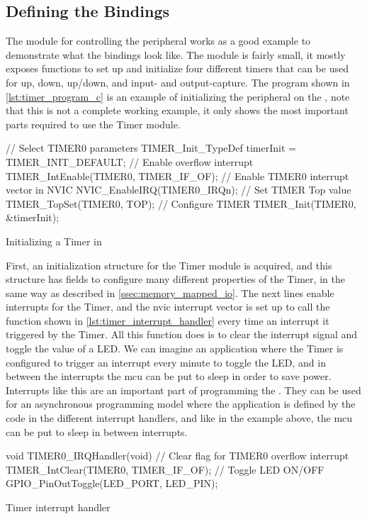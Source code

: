 \subsection{Defining the Bindings}

The {\emlib} module for controlling the  peripheral \cite{an0014_timer} works as a good example to demonstrate what the {\rust} bindings look like.
The module is fairly small, it mostly exposes functions to set up and initialize four different timers that can be used for up, down, up/down, and input- and output-capture.
The program shown in \autoref{lst:timer_program_c} is an example of initializing the  peripheral on the {\gecko}, note that this is not a complete working example, it only shows the most important parts required to use the Timer module.

\begin{listing}[h]
\begin{ccode}
// Select TIMER0 parameters
TIMER_Init_TypeDef timerInit = TIMER_INIT_DEFAULT;
// Enable overflow interrupt
TIMER_IntEnable(TIMER0, TIMER_IF_OF);
// Enable TIMER0 interrupt vector in NVIC
NVIC_EnableIRQ(TIMER0_IRQn);
// Set TIMER Top value
TIMER_TopSet(TIMER0, TOP);
// Configure TIMER
TIMER_Init(TIMER0, &timerInit);
\end{ccode}
\caption{Initializing a Timer in {\C}}
\label{lst:timer_program_c}
\end{listing}

First, an initialization structure for the Timer module is acquired, and this structure has fields to configure many different properties of the Timer, in the same way as described in \autoref{ssec:memory_mapped_io}.
The next lines enable interrupts for the Timer, and the \gls{nvic} interrupt vector is set up to call the function shown in \autoref{lst:timer_interrupt_handler} every time an interrupt it triggered by the Timer.
All this function does is to clear the interrupt signal and toggle the value of a LED.
We can imagine an application where the Timer is configured to trigger an interrupt every minute to toggle the LED, and in between the interrupts the \gls{mcu} can be put to sleep in order to save power.
Interrupts like this are an important part of programming the {\gecko}.
They can be used for an asynchronous programming model where the application is defined by the code in the different interrupt handlers, and like in the example above, the \gls{mcu} can be put to sleep in between interrupts.

\begin{listing}[h]
\begin{ccode}
void TIMER0_IRQHandler(void) {
  // Clear flag for TIMER0 overflow interrupt
  TIMER_IntClear(TIMER0, TIMER_IF_OF);
  // Toggle LED ON/OFF
  GPIO_PinOutToggle(LED_PORT, LED_PIN);
}
\end{ccode}
\caption{Timer interrupt handler}
\label{lst:timer_interrupt_handler}
\end{listing}

